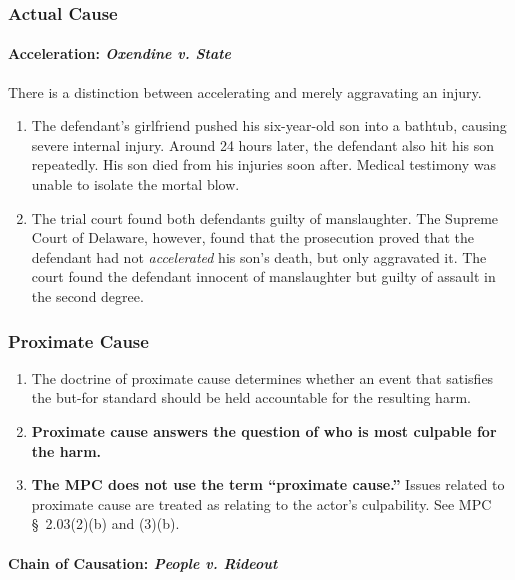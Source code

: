 \subsubsection{Actual Cause}

\paragraph{Acceleration: \emph{Oxendine v. State}}

There is a distinction between accelerating and merely aggravating an injury.

\begin{enumerate}
    \item The defendant's girlfriend pushed his six-year-old son into a 
    bathtub, causing severe internal injury. Around 24 hours later, the 
    defendant also hit his son repeatedly. His son died from his injuries soon 
    after. Medical testimony was unable to isolate the mortal blow.
    \item The trial court found both defendants guilty of manslaughter. The 
    Supreme Court of Delaware, however, found that the prosecution proved that 
    the defendant had not \emph{accelerated} his son's death, but only 
    aggravated it. The court found the defendant innocent of manslaughter but 
    guilty of assault in the second degree.
\end{enumerate}

\subsubsection{Proximate Cause} 

\begin{enumerate}
    \item The doctrine of proximate cause determines whether an event that 
    satisfies the but-for standard should be held accountable for the 
    resulting harm.
    \item \textbf{Proximate cause answers the question of who is most culpable 
    for the harm.}
    \item \textbf{The MPC does not use the term ``proximate cause.''} Issues 
    related to proximate cause are treated as relating to the actor's 
    culpability. See MPC \S\ 2.03(2)(b) and (3)(b).
\end{enumerate}

\paragraph{Chain of Causation: \emph{People v. Rideout}}

